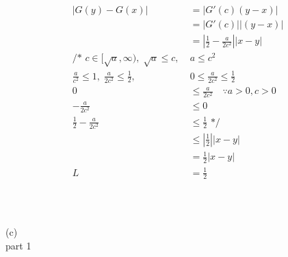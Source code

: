 \documentclass[12pt, border = 4pt, multi]{article} %
\begin{document}
\begin{align*}
|G(y) - G(x)| &= |G'(c)(y - x)|\\
&= |G'(c)||(y - x)|\\
&= \left|\frac{1}{2} - \frac{a}{2c ^ 2}\right||x - y|\\
\text{/* } c \in [\sqrt{a}, \infty),\; \sqrt{a} \leq c,\; &a \leq c ^ 2\\
\frac{a}{c ^ 2} \leq 1,\; \frac{a}{2c ^ 2} \leq \frac{1}{2},\; &0 \leq \frac{a}{2c ^ 2} \leq \frac{1}{2}\\
0 &\leq \frac{a}{2c ^ 2} \quad \because a > 0, c > 0\\
-\frac{a}{2c ^ 2} &\leq 0\\
\frac{1}{2} -\frac{a}{2c ^ 2} &\leq \frac{1}{2} \text{ */}\\
&\leq \left|\frac{1}{2}\right||x - y|\\
&= \frac{1}{2}|x - y|\\
L &= \frac{1}{2}\\
\end{align*}
\\
\\
\\
(c)\\
part 1
\end{document}
